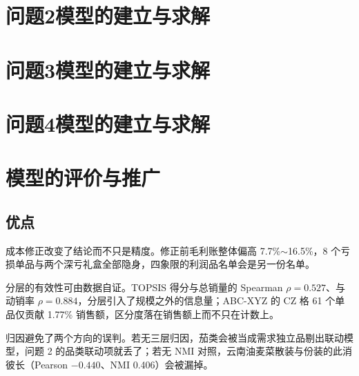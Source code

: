 \documentclass[zihao=-4,a4paper]{ctexart}
\begin{document}
\section{问题2模型的建立与求解}

\section{问题3模型的建立与求解}

\section{问题4模型的建立与求解}

\section{模型的评价与推广}

\subsection{优点}

成本修正改变了结论而不只是精度。修正前毛利账整体偏高 7.7\%$\sim$16.5\%，8 个亏损单品与两个深亏礼盒全部隐身，四象限的利润品名单会是另一份名单。

分层的有效性可由数据自证。TOPSIS 得分与总销量的 Spearman $\rho=0.527$、与动销率 $\rho=0.884$，分层引入了规模之外的信息量；ABC-XYZ 的 CZ 格 61 个单品仅贡献 1.77\% 销售额，区分度落在销售额上而不只在计数上。

归因避免了两个方向的误判。若无三层归因，茄类会被当成需求独立品剔出联动模型，问题 2 的品类联动项就丢了；若无 NMI 对照，云南油麦菜散装与份装的此消彼长（Pearson $-0.440$、NMI 0.406）会被漏掉。
\end{document}
